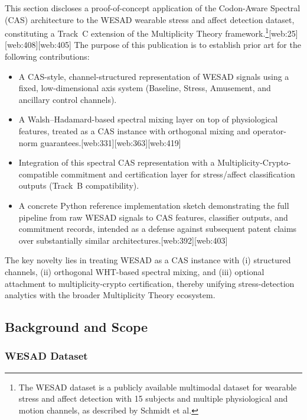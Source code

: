 \documentclass[11pt]{article}
\begin{document}
This section discloses a proof-of-concept application of the Codon-Aware Spectral (CAS) architecture to the WESAD wearable stress and affect detection dataset, constituting a Track~C extension of the Multiplicity Theory framework.\footnote{The WESAD dataset is a publicly available multimodal dataset for wearable stress and affect detection with 15 subjects and multiple physiological and motion channels, as described by Schmidt et al.\cite{Schmidt2018_WESAD,Schmidt2018_WESAD_UBI}}[web:25][web:408][web:405] The purpose of this publication is to establish prior art for the following contributions:

\begin{itemize}
  \item A CAS-style, channel-structured representation of WESAD signals using a fixed, low-dimensional axis system (Baseline, Stress, Amusement, and ancillary control channels).
  \item A Walsh--Hadamard-based spectral mixing layer on top of physiological features, treated as a CAS instance with orthogonal mixing and operator-norm guarantees.\cite{WHTOverview,WHTOrthogonal}[web:331][web:363][web:419]
  \item Integration of this spectral CAS representation with a Multiplicity-Crypto-compatible commitment and certification layer for stress/affect classification outputs (Track~B compatibility).
  \item A concrete Python reference implementation sketch demonstrating the full pipeline from raw WESAD signals to CAS features, classifier outputs, and commitment records, intended as a defense against subsequent patent claims over substantially similar architectures.\cite{WESAD_JohnsonGitHub,WESAD_MMIImplementation}[web:392][web:403]
\end{itemize}

The key novelty lies in treating WESAD as a CAS instance with (i) structured channels, (ii) orthogonal WHT-based spectral mixing, and (iii) optional attachment to multiplicity-crypto certification, thereby unifying stress-detection analytics with the broader Multiplicity Theory ecosystem.

\subsection{Background and Scope}

\subsubsection{WESAD Dataset}
\end{document}
